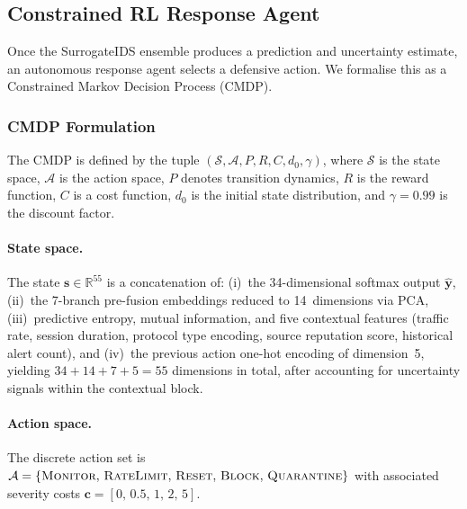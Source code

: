\subsection{Constrained RL Response Agent}
\label{sec:cpo}

Once the SurrogateIDS ensemble produces a prediction and uncertainty
estimate, an autonomous response agent selects a defensive action.  We
formalise this as a Constrained Markov Decision Process (CMDP).

\subsubsection{CMDP Formulation}
The CMDP is defined by the tuple
$(\mathcal{S},\mathcal{A},P,R,C,d_0,\gamma)$, where $\mathcal{S}$ is
the state space, $\mathcal{A}$ is the action space, $P$ denotes
transition dynamics, $R$ is the reward function, $C$ is a cost function,
$d_0$ is the initial state distribution, and $\gamma=0.99$ is the
discount factor.

\paragraph{State space.}
The state $\mathbf{s}\in\mathbb{R}^{55}$ is a concatenation of: (i)~the
34-dimensional softmax output $\hat{\mathbf{y}}$, (ii)~the 7-branch
pre-fusion embeddings reduced to 14~dimensions via PCA, (iii)~predictive
entropy, mutual information, and five contextual features (traffic rate,
session duration, protocol type encoding, source reputation score,
historical alert count), and (iv)~the previous action one-hot encoding
of dimension~5, yielding $34+14+7+5=55$ dimensions in total, after accounting for uncertainty signals within the contextual block.

\paragraph{Action space.}
The discrete action set is
$\mathcal{A}=\{\textsc{Monitor},\,\textsc{RateLimit},\,
\textsc{Reset},\,\textsc{Block},\,\textsc{Quarantine}\}$
with associated severity costs
$\mathbf{c}=[0,\,0.5,\,1,\,2,\,5]$.


